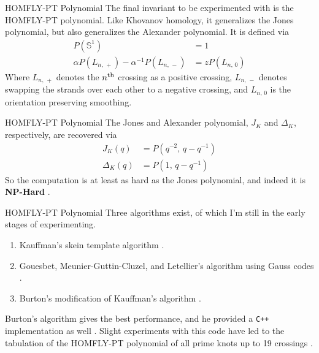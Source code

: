 \documentclass{beamer}
\begin{document}
    \begin{frame}{HOMFLY-PT Polynomial}
        The final invariant to be experimented with is the HOMFLY-PT
        polynomial. Like Khovanov homology, it generalizes the Jones polynomial,
        but also generalizes the Alexander polynomial. It is defined via
        \begin{align}
            P(\mathbb{S}^{1})&=1\\
            \alpha{P}(L_{n,\,+})-\alpha^{-1}P(L_{n,\,-})
            &=zP(L_{n,\,0})
        \end{align}
        Where $L_{n,\,+}$ denotes the $n^{\small\textrm{th}}$ crossing as a
        positive crossing, $L_{n,\,-}$ denotes swapping the strands over each
        other to a negative crossing, and $L_{n,\,0}$ is the
        orientation preserving smoothing.
    \end{frame}
    \begin{frame}{HOMFLY-PT Polynomial}
        The Jones and Alexander polynomial, $J_{K}$ and $\Delta_{K}$,
        respectively, are recovered via
        \begin{align}
            J_{K}(q)&=P(q^{-2},\,q-q^{-1})\\
            \Delta_{K}(q)&=P(1,\,q-q^{-1})
        \end{align}
        So the computation is at least as hard as the Jones polynomial, and
        indeed it is \textbf{NP-Hard} \cite{HOMFLYPTNPHard}.
    \end{frame}
    \begin{frame}{HOMFLY-PT Polynomial}
        Three algorithms exist, of which I'm still in the early stages of
        experimenting.
        \begin{enumerate}
            \item Kauffman's skein template algorithm \cite{KauffmanStateModelsLinkPolynomials}.
            \item Gouesbet, Meunier-Guttin-Cluzel, and Letellier's algorithm using Gauss codes \cite{GouesbetHOMFLYAlgorithm}.
            \item Burton's modification of Kauffman's algorithm \cite{Burton2018HOMFLFixedParameter}.
        \end{enumerate}
        Burton's algorithm gives the best performance, and he provided a
        \texttt{C++} implementation as well \cite{regina}. Slight experiments
        with this code have led to the tabulation of the HOMFLY-PT polynomial
        of all prime knots up to 19 crossings
        \cite{HOMFLYData}.
    \end{frame}
\end{document}
